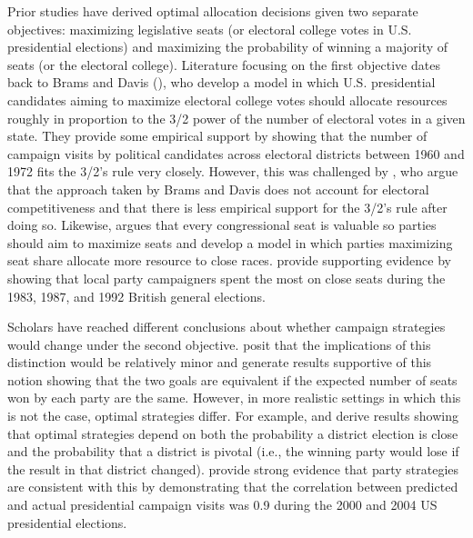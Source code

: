 \documentclass[12pt,final,fleqn]{article}
\theoremstyle{plain}
\begin{document}
Prior studies have derived optimal allocation decisions given two separate objectives: maximizing legislative seats (or electoral college votes in U.S. presidential elections) and maximizing the probability of winning a majority of seats (or the electoral college). Literature focusing on the first objective dates back to Brams and Davis (\citeyear{brams1973resource, brams19743}), who develop a model in which U.S. presidential candidates aiming to maximize electoral college votes should allocate resources roughly in proportion to the 3/2 power of the number of electoral votes in a given state. They provide some empirical support by showing that the number of campaign visits by political candidates across electoral districts between 1960 and 1972 fits the 3/2's rule very closely. However, this was challenged by \citet{colantoni1975campaign}, who argue that the approach taken by Brams and Davis does not account for electoral competitiveness and that there is less empirical support for the 3/2's rule after doing so. Likewise, \citet{jacobson1985party} argues that every congressional seat is valuable so parties should aim to maximize seats and \citet{snyder1989election} develop a model in which parties maximizing seat share allocate more resource to close races. \citet{pattie1995winning} provide supporting evidence by showing that local party campaigners spent the most on close seats during the 1983, 1987, and 1992 British general elections.  

Scholars have reached different conclusions about whether campaign strategies would change under the second objective. \citet{brams1973resource} posit that the implications of this distinction would be relatively minor and \citet{aranson1974election} generate results supportive of this notion showing that the two goals are equivalent if the expected number of seats won by each party are the same. However, in more realistic settings in which this is not the case, optimal strategies differ. For example, \citet{snyder1989election} and \citet{stromberg2008electoral} derive results showing that optimal strategies depend on both the probability a district election is close and the probability that a district is pivotal (i.e., the winning party would lose if the result in that district changed). \citet{stromberg2008electoral} provide strong evidence that party strategies are consistent with this by demonstrating that the correlation between predicted and actual presidential campaign visits was 0.9 during the 2000 and 2004 US presidential elections.
\end{document}
